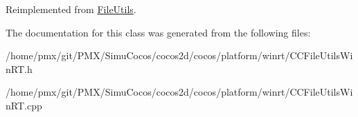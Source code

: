 Reimplemented from \hyperlink{classFileUtils_aed08c5ac2854f3fb5c104386ab96a90c}{File\+Utils}.



The documentation for this class was generated from the following files\+:\begin{DoxyCompactItemize}
\item 
/home/pmx/git/\+P\+M\+X/\+Simu\+Cocos/cocos2d/cocos/platform/winrt/C\+C\+File\+Utils\+Win\+R\+T.\+h\item 
/home/pmx/git/\+P\+M\+X/\+Simu\+Cocos/cocos2d/cocos/platform/winrt/C\+C\+File\+Utils\+Win\+R\+T.\+cpp\end{DoxyCompactItemize}
